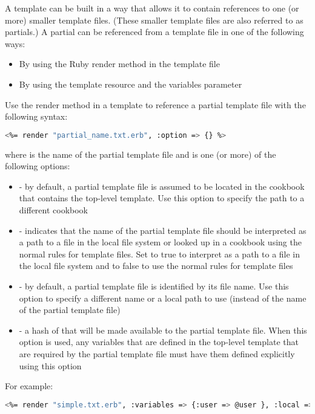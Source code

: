 A template can be built in a way that allows it to contain references to one (or more) smaller template files. (These smaller template files are also referred to as partials.) A partial can be referenced from a template file in one of the following ways:

\begin{itemize}
  \item By using the Ruby render method in the template file
  \item By using the template resource and the variables parameter
\end{itemize}

Use the render method in a template to reference a partial template file with the following syntax:

\begin{lstlisting}[language=Bash,label=lst:cookbook-templates9]
<%= render "partial_name.txt.erb", :option => {} %>
\end{lstlisting}

where  is the name of the partial template file and  is one (or more) of the following options:

\begin{itemize}
  \item {} - by default, a partial template file is assumed to be located in the cookbook that contains the top-level template. Use this option to specify the path to a different cookbook
  \item {} - indicates that the name of the partial template file should be interpreted as a path to a file in the local file system or looked up in a cookbook using the normal rules for template files. Set to true to interpret as a path to a file in the local file system and to false to use the normal rules for template files
  \item {} - by default, a partial template file is identified by its file name. Use this option to specify a different name or a local path to use (instead of the name of the partial template file)
  \item {} - a hash of  that will be made available to the partial template file. When this option is used, any variables that are defined in the top-level template that are required by the partial template file must have them defined explicitly using this option
\end{itemize}

For example:

\begin{lstlisting}[language=Bash,label=lst:cookbook-templates10]
<%= render "simple.txt.erb", :variables => {:user => @user }, :local => true %>
\end{lstlisting}

